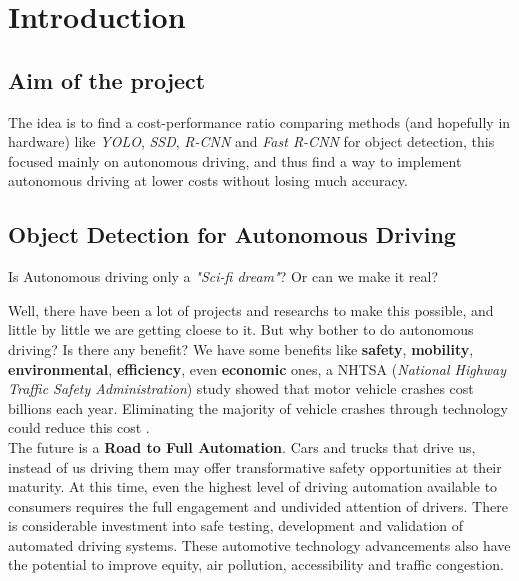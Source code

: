 \section{Introduction}
\label{section: introduction}

\subsection{Aim of the project}
The idea is to find a cost-performance ratio comparing methods (and hopefully in
hardware) like \textit{YOLO}, \textit{SSD}, \textit{R-CNN} and
\textit{Fast R-CNN} for object detection, this focused mainly on autonomous
driving, and thus find a way to implement autonomous driving at lower costs
without losing much accuracy.

\subsection{Object Detection for Autonomous Driving}
Is Autonomous driving only a \textit{"Sci-fi dream"}? Or can we make it real?


Well, there have been a lot of projects and researchs to make this possible, and
little by little we are getting cloese to it. But why bother to do autonomous
driving? Is there any benefit? We have some benefits like \textbf{safety}, 
\textbf{mobility}, \textbf{environmental}, \textbf{efficiency}, even 
\textbf{economic} ones, a NHTSA
(\textit{National Highway Traffic Safety Administration}) study showed that
motor vehicle crashes cost billions each year. Eliminating the majority of
vehicle crashes through technology could reduce this cost \cite{nhtsa}.\\


The future is a \textbf{Road to Full Automation}. Cars and trucks that drive us,
instead of us driving them may offer transformative safety opportunities at
their maturity. At this time, even the highest level of driving automation
available to consumers requires the full engagement and undivided attention of
drivers. There is considerable investment into safe testing, development and
validation of automated driving systems. These automotive technology
advancements also have the potential to improve equity, air pollution,
accessibility and traffic congestion.
